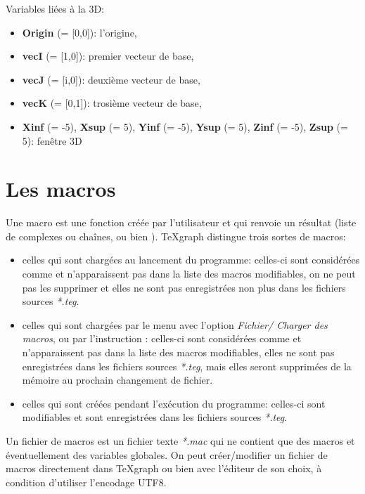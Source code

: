 Variables liées à la 3D:

\begin{itemize}
 \item  \textbf{Origin} (= [0,0]): l'origine,
 \item  \textbf{vecI} (= [1,0]): premier vecteur de base,
 \item  \textbf{vecJ} (= [i,0]): deuxième vecteur de base,
 \item  \textbf{vecK} (= [0,1]): trosième vecteur de base,
 \item  \textbf{Xinf} (= -5), \textbf{Xsup} (= 5), \textbf{Yinf} (= -5), \textbf{Ysup} (= 5), \textbf{Zinf} (= -5), \textbf{Zsup} (= 5): fenêtre 3D
\end{itemize}


\section{Les macros}\label{macros}

Une macro est une fonction créée par l'utilisateur et qui renvoie un résultat (liste de complexes ou chaînes, ou bien \Nil). TeXgraph distingue trois sortes de macros: 

\begin{itemize}
\item celles qui sont chargées au lancement du programme: celles-ci sont considérées comme  et n'apparaissent pas dans la liste des macros modifiables, on ne peut pas les supprimer et elles ne sont pas enregistrées non plus dans les fichiers  sources \textit{*.teg}.

\item celles qui sont chargées par le menu avec l'option \textit{Fichier/ Charger des macros}, ou par l'instruction : celles-ci sont considérées comme  et n'apparaissent pas dans la liste des macros modifiables, elles ne sont pas enregistrées dans les fichiers sources \textit{*.teg}, mais elles seront supprimées de la mémoire au prochain changement de fichier.

\item celles qui sont créées pendant l'exécution du programme: celles-ci sont modifiables et sont enregistrées dans les fichiers sources \textit{*.teg}.
\end{itemize}

Un fichier de macros est un fichier texte \textit{*.mac} qui ne contient que des macros et éventuellement des variables globales. On peut créer/modifier un fichier de macros directement dans TeXgraph ou bien avec l'éditeur de son choix, à condition d'utiliser l'encodage UTF8.


